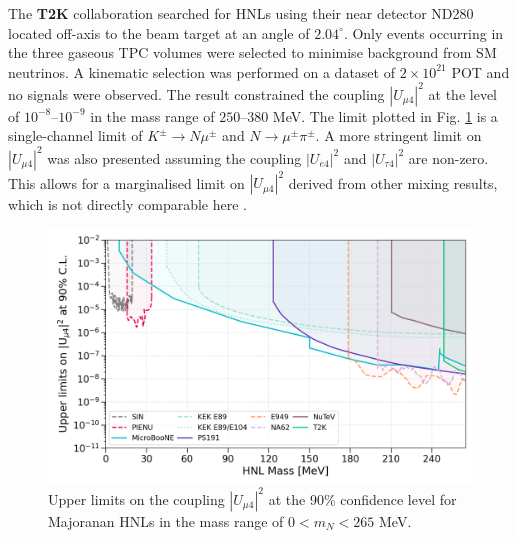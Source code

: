 \begin{coloritemize}
\item The \textbf{T2K} collaboration searched for HNLs using their near detector ND280 located off-axis to the beam target at an angle of $2.04^\circ$.
Only events occurring in the three gaseous TPC volumes were selected to minimise background from SM neutrinos.
A kinematic selection was performed on a dataset of $2\times10^{21}$ POT and no signals were observed.
The result constrained the coupling $|U_{\mu4}|^2$ at the level of $10^{-8}$--$10^{-9}$ in the mass range of $250$--$380$ MeV. 
The limit plotted in Fig. \ref{fig:sensitivity_theory} is a single-channel limit of $K^\pm \rightarrow N\mu^\pm$ and $N \rightarrow \mu^\pm\pi^\pm$.
A more stringent limit on $|U_{\mu4}|^2$ was also presented assuming the coupling $|U_{e4}|^2$ and $|U_{\tau4}|^2$ are non-zero.
This allows for a marginalised limit on $|U_{\mu4}|^2$ derived from other mixing results, which is not directly comparable here \cite{t2k}.

\begin{figure}[t!] 
\centering    
\includegraphics[width=1.0\textwidth]{sensitivity}
\caption[Experimental Upper Limits on The Mixing $|U_{\mu4}|^{2}$ of Heavy Neutral Leptons]{
Upper limits on the coupling $|U_{\mu4}|^{2}$ at the 90\% confidence level for Majoranan HNLs in the mass range of $0 < m_{N} < 265$ MeV.
}
\label{fig:sensitivity_theory}
\end{figure}


\end{coloritemize}
